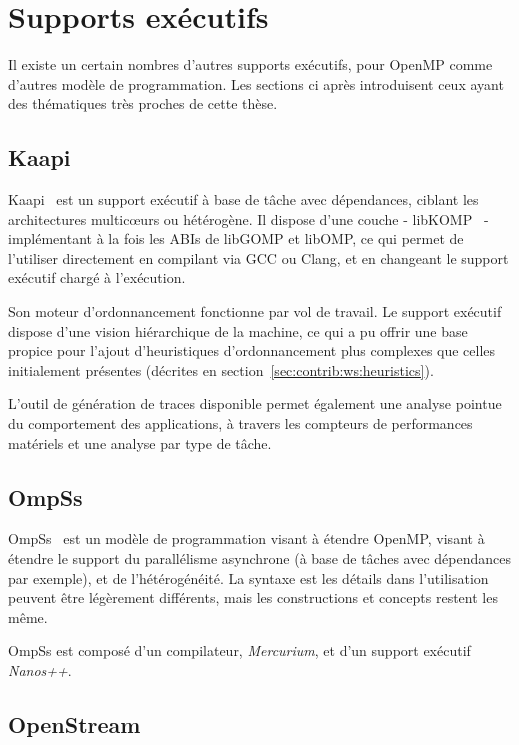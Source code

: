 \section{Supports exécutifs}\label{sec:rw:other-runtimes}

Il existe un certain nombres d'autres supports exécutifs, pour OpenMP comme d'autres modèle de programmation.
Les sections ci après introduisent ceux ayant des thématiques très proches de cette thèse.

\subsection{Kaapi}

Kaapi~\cite{Gautier2007} est un support exécutif à base de tâche avec dépendances, ciblant les architectures multicœurs ou hétérogène.
Il dispose d'une couche - libKOMP~\cite{Broquedis2012} - implémentant à la fois les ABIs de libGOMP et libOMP, ce qui permet de l'utiliser directement en compilant via GCC ou Clang, et en changeant le support exécutif chargé à l'exécution.

Son moteur d'ordonnancement fonctionne par vol de travail.
Le support exécutif dispose d'une vision hiérarchique de la machine, ce qui a pu offrir une base propice pour l'ajout d'heuristiques d'ordonnancement plus complexes que celles initialement présentes (décrites en section~\ref{sec:contrib:ws:heuristics}).

L'outil de génération de traces disponible permet également une analyse pointue du comportement des applications, à travers les compteurs de performances matériels et une analyse par type de tâche.


\subsection{OmpSs}\label{subsec:rw:ompss}

OmpSs~\cite{OMPSs} est un modèle de programmation visant à étendre OpenMP, visant à étendre le support du parallélisme asynchrone (à base de tâches avec dépendances par exemple), et de l'hétérogénéité.
La syntaxe est les détails dans l'utilisation peuvent être légèrement différents, mais les constructions et concepts restent les même.

OmpSs est composé d'un compilateur, \emph{Mercurium}, et d'un support exécutif \emph{Nanos++}.

\subsection{OpenStream}

